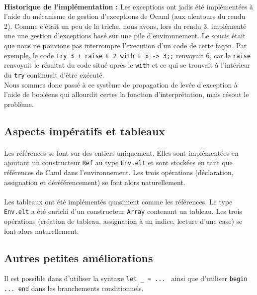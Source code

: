 \paragraph{}\textbf{Historique de l'implémentation :} Les exceptions ont jadis été implémentées à l'aide du mécanisme de gestion d'exceptions de Ocaml (aux alentours du rendu 2). Comme c'était un peu de la triche, nous avons, lors du rendu 3, implémenté une une gestion d'exceptions basé sur une pile d'environnement. Le soucis était que nous ne pouvions pas interrompre l'execution d'un code de cette façon. Par exemple, le code \texttt{try 3 + raise E 2 with E x -> 3;;} renvoyait 6, car le \texttt{raise} renvoyait le résultat du code situé après le \texttt{with} et ce qui se trouvait à l'intérieur du \texttt{try} continuait d'être exécuté. \\
Nous sommes donc passé à ce système de propagation de levée d'exception à l'aide de booléens qui allourdit certes la fonction d'interprétation, mais résout le problème.

\subsection{Aspects impératifs et tableaux}

\paragraph{} Les références se font sur des entiers uniquement. Elles sont implémentées en ajoutant un constructeur \texttt{Ref} au type \texttt{Env.elt} et sont stockées en tant que références de Caml dans l'environnement. Les trois opérations (déclaration, assignation et déréférencement) se font alors naturellement.

\paragraph{} Les tableaux ont été implémentés quasiment comme les références. Le type \texttt{Env.elt} a été enrichi d'un constructeur \texttt{Array} contenant un tableau. Les trois opérations (création de tableau, assignation à un indice, lecture d'une case) se font alors naturellement.

\subsection{Autres petites améliorations}
Il est possible dans \fouine d'utiliser la syntaxe \texttt{let \_ = ... } ainsi que d'utiliser \texttt{begin ... end} dans les branchements conditionnels.

